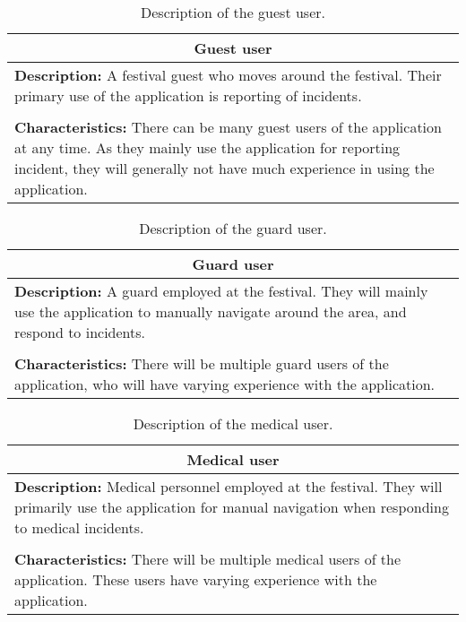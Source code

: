 \begin{table}[htbp]
    \centering
    \begin{tabularx}{/4}{X}
        \toprule
        \multicolumn{1}{c}{\textbf{Guest user}} \\ 
        \midrule
        \textbf{Description:} A festival guest who moves around the festival. Their primary use of the application is reporting of incidents. \\
        \\
        \textbf{Characteristics:} There can be many guest users of the application at any time. As they mainly use the application for reporting incident, they will generally not have much experience in using the application. \\
        \bottomrule
    \end{tabularx}
    \caption{Description of the guest user.}
    \label{tab:guest_user}
\end{table}

\begin{table}[htbp]
    \centering
    \begin{tabularx}{/4}{X}
        \toprule
        \multicolumn{1}{c}{\textbf{Guard user}} \\ 
        \midrule
        \textbf{Description:} A guard employed at the festival. They will mainly use the application to manually navigate around the area, and respond to incidents. \\
        \\
        \textbf{Characteristics:} There will be multiple guard users of the application, who will have varying experience with the application. \\
        \bottomrule
    \end{tabularx}
    \caption{Description of the guard user.}
    \label{tab:guard_user}
\end{table}

\begin{table}[htbp]
    \centering
    \begin{tabularx}{/4}{X}
        \toprule
        \multicolumn{1}{c}{\textbf{Medical user}} \\ 
        \midrule
        \textbf{Description:} Medical personnel employed at the festival. They will primarily use the application for manual navigation when responding to medical incidents. \\
        \\
        \textbf{Characteristics:} There will be multiple medical users of the application. These users have varying experience with the application. \\
        \bottomrule
    \end{tabularx}
    \caption{Description of the medical user.}
    \label{tab:med_user}
\end{table}